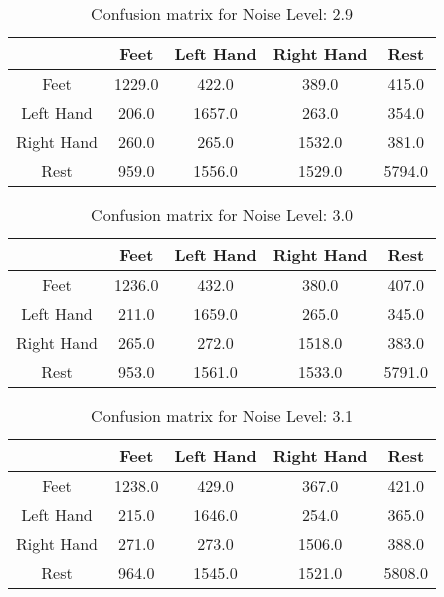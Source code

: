 \begin{table}[!htbp]
    \centering
    \begin{tabular}{|c||c|c|c|c|}
        \hline
		 & Feet & Left Hand & Right Hand & Rest \\
        \hline
        \hline
        Feet & 1229.0 & 422.0 & 389.0 & 415.0 \\
        \hline
        Left Hand & 206.0 & 1657.0 & 263.0 & 354.0 \\
        \hline
        Right Hand & 260.0 & 265.0 & 1532.0 & 381.0 \\
        \hline
        Rest & 959.0 & 1556.0 & 1529.0 & 5794.0 \\
        \hline
    \end{tabular}
    \caption{Confusion matrix for Noise Level: 2.9}
\end{table}

\begin{table}[!htbp]
    \centering
    \begin{tabular}{|c||c|c|c|c|}
        \hline
		 & Feet & Left Hand & Right Hand & Rest \\
        \hline
        \hline
        Feet & 1236.0 & 432.0 & 380.0 & 407.0 \\
        \hline
        Left Hand & 211.0 & 1659.0 & 265.0 & 345.0 \\
        \hline
        Right Hand & 265.0 & 272.0 & 1518.0 & 383.0 \\
        \hline
        Rest & 953.0 & 1561.0 & 1533.0 & 5791.0 \\
        \hline
    \end{tabular}
    \caption{Confusion matrix for Noise Level: 3.0}
\end{table}

\begin{table}[!htbp]
    \centering
    \begin{tabular}{|c||c|c|c|c|}
        \hline
		 & Feet & Left Hand & Right Hand & Rest \\
        \hline
        \hline
        Feet & 1238.0 & 429.0 & 367.0 & 421.0 \\
        \hline
        Left Hand & 215.0 & 1646.0 & 254.0 & 365.0 \\
        \hline
        Right Hand & 271.0 & 273.0 & 1506.0 & 388.0 \\
        \hline
        Rest & 964.0 & 1545.0 & 1521.0 & 5808.0 \\
        \hline
    \end{tabular}
    \caption{Confusion matrix for Noise Level: 3.1}
\end{table}

